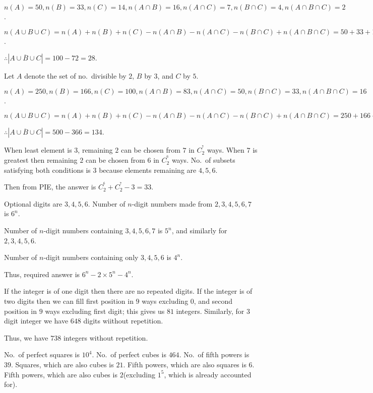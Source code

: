   $n(A) = 50, n(B) = 33, n(C) = 14, n(A\cap B) = 16, n(A\cap C) = 7, n(B\cap C) = 4, n(A\cap B\cap C) = 2$.

  $n(A\cup B\cup C) = n(A) + n(B) + n(C) - n(A\cap B) - n(A\cap C) - n(B\cap C) + n(A\cap B\cap C) = 50 + 33
  + 14 - 16 - 7 - 4 + 2 = 72$.

  $\therefore |\overline{A\cup B\cup C}| = 100 - 72 = 28$.
\item Let $A$ denote the set of no.\ divisible by $2$, $B$ by $3$, and $C$ by $5$.

  $n(A) = 250, n(B) = 166, n(C) = 100, n(A\cap B) = 83, n(A\cap C) = 50, n(B\cap C) = 33, n(A\cap B\cap C) =
  16$.

  $n(A\cup B\cup C) = n(A) + n(B) + n(C) - n(A\cap B) - n(A\cap C) - n(B\cap C) + n(A\cap B\cap C) = 250 +
  166 + 100 - 83 - 50 - 33 + 16 = 366$

  $\therefore |\overline{A\cup B\cup C}| = 500 - 366 = 134$.
\item When least element is $3$, remaining $2$ can be chosen from $7$ in $C_2^^7$ ways. When $7$ is greatest
  then remaining $2$ can be chosen from $6$ in $C_2^^6$ ways. No.\ of subsets satisfying both conditions is
  $3$ because elements remaining are $4, 5, 6$.

  Then from PIE, the answer is $C_2^^6 + C_2^^7 - 3 = 33$.
\item Optional digits are $3, 4, 5, 6$. Number of $n$-digit numbers made from $2, 3, 4, 5, 6, 7$ is $6^n$.

  Number of $n$-digit numbers containing $3, 4, 5, 6, 7$ is $5^n$, and similarly for $2, 3, 4, 5, 6$.

  Number of $n$-digit numbers containing only $3, 4, 5, 6$ is $4^n$.

  Thus, required answer is $6^n - 2\times5^n - 4^n$.
\item If the integer is of one digit then there are no repeated digits. If the integer is of two digits then
  we can fill first position in $9$ ways excluding $0$, and second position in $9$ ways excluding first
  digit; this gives us $81$ integers. Similarly, for $3$ digit integer we have $648$ digits wiithout
  repetition.

  Thus, we have $738$ integers without repetition.
\item No.\ of perfect squares is $10^4$. No.\ of perfect cubes is $464$. No.\ of fifth powers is
  $39$. Squares, which are also cubes is $21$. Fifth powers, which are also squares is $6$. Fifth powers,
  which are also cubes is $2$(excluding $1^5$, which is already accounted for).

